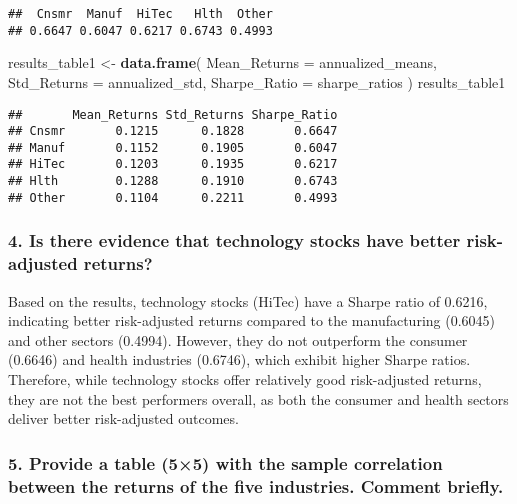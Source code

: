 \documentclass[
]{article}
\newenvironment{Shaded}{\begin{snugshade}}{\end{snugshade}}
\newcommand{\AttributeTok}[1]{\textcolor[rgb]{0.13,0.29,0.53}{#1}}
\newcommand{\FunctionTok}[1]{\textcolor[rgb]{0.13,0.29,0.53}{\textbf{#1}}}
\newcommand{\NormalTok}[1]{#1}
\newcommand{\OtherTok}[1]{\textcolor[rgb]{0.56,0.35,0.01}{#1}}
\begin{document}
\begin{verbatim}
##  Cnsmr  Manuf  HiTec   Hlth  Other 
## 0.6647 0.6047 0.6217 0.6743 0.4993
\end{verbatim}

\begin{Shaded}
\begin{Highlighting}[]
\NormalTok{results\_table1 }\OtherTok{\textless{}{-}} \FunctionTok{data.frame}\NormalTok{(}
  \AttributeTok{Mean\_Returns =}\NormalTok{ annualized\_means,}
  \AttributeTok{Std\_Returns =}\NormalTok{ annualized\_std,}
  \AttributeTok{Sharpe\_Ratio =}\NormalTok{ sharpe\_ratios}
\NormalTok{ )}
\NormalTok{results\_table1}
\end{Highlighting}
\end{Shaded}

\begin{verbatim}
##       Mean_Returns Std_Returns Sharpe_Ratio
## Cnsmr       0.1215      0.1828       0.6647
## Manuf       0.1152      0.1905       0.6047
## HiTec       0.1203      0.1935       0.6217
## Hlth        0.1288      0.1910       0.6743
## Other       0.1104      0.2211       0.4993
\end{verbatim}

\hypertarget{is-there-evidence-that-technology-stocks-have-better-risk-adjusted-returns}{%
\subsubsection{4. Is there evidence that technology stocks have better
risk-adjusted
returns?}\label{is-there-evidence-that-technology-stocks-have-better-risk-adjusted-returns}}

Based on the results, technology stocks (HiTec) have a Sharpe ratio of
0.6216, indicating better risk-adjusted returns compared to the
manufacturing (0.6045) and other sectors (0.4994). However, they do not
outperform the consumer (0.6646) and health industries (0.6746), which
exhibit higher Sharpe ratios. Therefore, while technology stocks offer
relatively good risk-adjusted returns, they are not the best performers
overall, as both the consumer and health sectors deliver better
risk-adjusted outcomes.

\hypertarget{provide-a-table-55-with-the-sample-correlation-between-the-returns-of-the-five-industries.-comment-briefly.}{%
\subsubsection{5. Provide a table (5×5) with the sample correlation
between the returns of the five industries. Comment
briefly.}\label{provide-a-table-55-with-the-sample-correlation-between-the-returns-of-the-five-industries.-comment-briefly.}}
\end{document}
